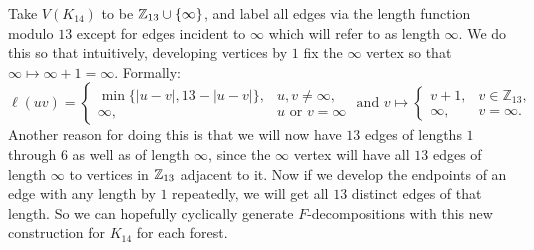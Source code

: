 Take $V(K_{14})$ to be $\mathbb{Z}_{13}\cup \{\infty\}$, and label all edges via the length function modulo $13$ except for edges incident to $\infty$ which will refer to as length $\infty$. We do this so that intuitively, developing vertices by $1$ fix the $\infty$ vertex so that $\infty\mapsto \infty+1=\infty$. Formally:
$$\ell(uv)=\begin{cases}\min\{|u-v|,13-|u-v|\}, & u,v\neq \infty, \\ \infty, & u\text{ or }v=\infty \end{cases} \text{ and }v\mapsto 
\begin{cases}
  v+1,&v\in\mathbb{Z}_{13},\\
  \infty,        &v=\infty.
  \end{cases}$$
Another reason for doing this is that we will now have $13$ edges of lengths $1$ through $6$ as well as of length $\infty$, since the $\infty$ vertex will have all $13$ edges of length $\infty$ to vertices in $\mathbb{Z}_{13}$ adjacent to it. Now if we develop the endpoints of an edge with any length by $1$ repeatedly, we will get all $13$ distinct edges of that length. So we can hopefully cyclically generate $F$-decompositions with this new construction for $K_{14}$ for each forest.

